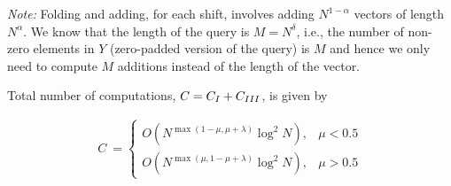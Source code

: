 \begin{enumerate}
	
	{\textit{Note:}} Folding and adding, for each shift, involves adding $N^{1-\alpha}$ vectors of length $N^{\alpha}$. We know that the length of the query is $M =N^{\delta}$, i.e., the number of non-zero elements in $Y$ (zero-padded version of the query) is $M$ and hence we only need to compute $M$ additions instead of the length of the vector.
	
\end{enumerate}

Total number of computations, $C = C_{\RNum{1}}+C_{\RNum{3}} $, is given by

   
  \begin{align*}
  C \ =
  \begin{cases}
  O(N^{\max(1-\mu, \mu + \lambda) } \log^2 N ), &  	 \mu < 0.5\\
  O(N^{\max(\mu, 1- \mu + \lambda )} \log^2 N ), &  	 \mu > 0.5
  \end{cases}
  \end{align*}
  



